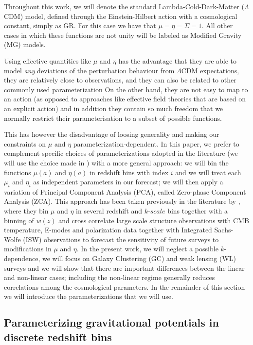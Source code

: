 Throughout this work, we will denote the standard Lambda-Cold-Dark-Matter ($\Lambda$CDM) model,
defined through the Einstein-Hilbert action with a cosmological constant, simply as GR. For this case
we have that $\mu=\eta=\Sigma=1$. All other cases in which these functions are not unity will be labeled
as Modified Gravity (MG) models.

Using effective quantities like $\mu$ and $\eta$ has the advantage
that they are able to model {\em any} deviations of the perturbation
behaviour from $\Lambda$CDM expectations, they are relatively close 
to observations, and they can also be related to other commonly used 
parameterization \cite{pogosian_how_2010}
On the other hand, they are not
easy to map to an action (as opposed to approaches like effective
field theories that are based on an explicit action) and in addition they
contain so much freedom that we normally restrict their parameterisation
to a subset of possible functions.

This has however
the disadvantage of loosing generality and making our constraints
on $\mu$ and $\eta$ parameterization-dependent. In this
paper, we prefer to complement specific choices of parameterizations
adopted in the literature (we will use the choice made in \cite{planck_collaboration_planck_2016}) 
with a more general approach: we will bin
the functions $\mu(a)$ and $\eta(a)$ in redshift bins with index
$i$ and we will treat each $\mu_{i}$ and $\eta_{i}$ as independent
parameters in our forecast; we will then apply a variation of Principal Component Analysis (PCA), called Zero-phase Component Analysis (ZCA).
This approach has been taken previously
in the literature by \cite{hojjati_cosmological_2012}, where they
bin $\mu$ and $\eta$ in several redshift and $k$-$scale$ bins
together with a binning of $w(z)$ and cross correlate large scale
structure observations with CMB temperature, E-modes and polarization
data together with Integrated Sachs-Wolfe (ISW) observations to forecast
the sensitivity of future surveys to modifications in $\mu$ and $\eta$.
In the present work, we will neglect a possible $k$-dependence, 
we will focus on Galaxy Clustering (GC) and weak
lensing (WL) surveys and we will show that there are important differences
between the linear and non-linear cases; including the non-linear regime generally reduces correlations
among the cosmological parameters. In the remainder of this section we will introduce the parameterizations that we will use.


\subsection{Parameterizing gravitational potentials in discrete redshift bins \label{sub:param-z-bins-th}}

